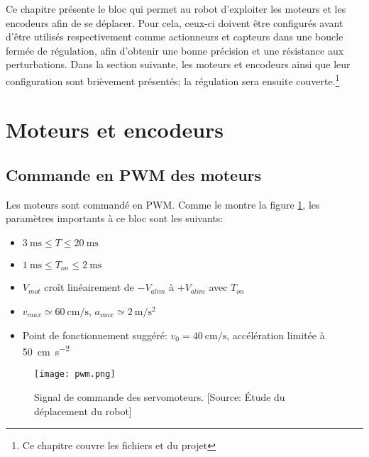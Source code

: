 Ce chapitre présente le bloc qui permet au robot d'exploiter les moteurs et les encodeurs afin de se déplacer. Pour cela, ceux-ci doivent être configurés avant d'être utilisés respectivement comme actionneurs et capteurs dans une boucle fermée de régulation, afin d'obtenir une bonne précision et une résistance aux perturbations. Dans la section suivante, les moteurs et encodeurs ainsi que leur configuration sont brièvement présentés; la régulation sera ensuite couverte.\footnote{Ce chapitre couvre les fichiers  et  du projet }

\section{Moteurs et encodeurs}
\subsection{Commande en PWM des moteurs}
Les moteurs sont commandé en PWM. Comme le montre la figure \ref{fig:SignalServo}, les paramètres importants à ce bloc sont les suivants:
\begin{itemize}
  \item $\SI{3}{\milli\second} \leq T \leq \SI{20}{\milli\second}$
  \item $ \SI{1}{\milli\second} \leq T_{on} \leq \SI{2}{\milli\second}$
  \item $V_{mot}$ croît linéairement de $-V_{alim}$ à $+V_{alim}$ avec $T_{on}$
  \item $v_{max} \simeq \SI{60}{\centi\meter\per\second}$, $a_{max} \simeq \SI{2}{\meter\per\second\squared}$
  \item Point de fonctionnement suggéré: $v_0 = \SI{40}{\centi\meter\per\second}$, accélération limitée à \SI{50}{\centi\meter\per\second\squared}
\end{itemize}
\begin{figure}[htbp]
\centering
\texttt{[image: pwm.png]}
\caption{\label{fig:SignalServo}Signal de commande des servomoteurs. [Source: \'Etude du déplacement du robot]}
\end{figure}

